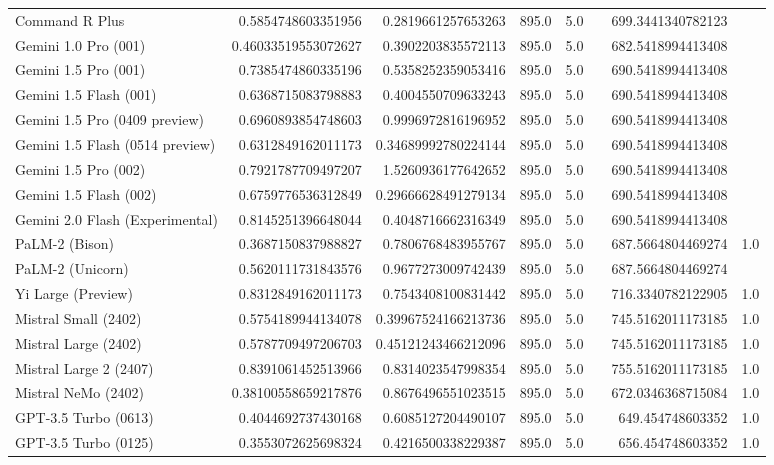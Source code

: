\begin{table}[htp]
{\begin{tabular}{lrrrrrrr}
Command R Plus & 0.5854748603351956 & 0.2819661257653263 & 895.0 & 5.0 &  & 699.3441340782123 &  \\
Gemini 1.0 Pro (001) & 0.46033519553072627 & 0.3902203835572113 & 895.0 & 5.0 &  & 682.5418994413408 &  \\
Gemini 1.5 Pro (001) & 0.7385474860335196 & 0.5358252359053416 & 895.0 & 5.0 &  & 690.5418994413408 &  \\
Gemini 1.5 Flash (001) & 0.6368715083798883 & 0.4004550709633243 & 895.0 & 5.0 &  & 690.5418994413408 &  \\
Gemini 1.5 Pro (0409 preview) & 0.6960893854748603 & 0.9996972816196952 & 895.0 & 5.0 &  & 690.5418994413408 &  \\
Gemini 1.5 Flash (0514 preview) & 0.6312849162011173 & 0.34689992780224144 & 895.0 & 5.0 &  & 690.5418994413408 &  \\
Gemini 1.5 Pro (002) & 0.7921787709497207 & 1.5260936177642652 & 895.0 & 5.0 &  & 690.5418994413408 &  \\
Gemini 1.5 Flash (002) & 0.6759776536312849 & 0.29666628491279134 & 895.0 & 5.0 &  & 690.5418994413408 &  \\
Gemini 2.0 Flash (Experimental) & 0.8145251396648044 & 0.4048716662316349 & 895.0 & 5.0 &  & 690.5418994413408 &  \\
PaLM-2 (Bison) & 0.3687150837988827 & 0.7806768483955767 & 895.0 & 5.0 &  & 687.5664804469274 & 1.0 \\
PaLM-2 (Unicorn) & 0.5620111731843576 & 0.9677273009742439 & 895.0 & 5.0 &  & 687.5664804469274 &  \\
Yi Large (Preview) & 0.8312849162011173 & 0.7543408100831442 & 895.0 & 5.0 &  & 716.3340782122905 & 1.0 \\
Mistral Small (2402) & 0.5754189944134078 & 0.39967524166213736 & 895.0 & 5.0 &  & 745.5162011173185 & 1.0 \\
Mistral Large (2402) & 0.5787709497206703 & 0.45121243466212096 & 895.0 & 5.0 &  & 745.5162011173185 & 1.0 \\
Mistral Large 2 (2407) & 0.8391061452513966 & 0.8314023547998354 & 895.0 & 5.0 &  & 755.5162011173185 & 1.0 \\
Mistral NeMo (2402) & 0.38100558659217876 & 0.8676496551023515 & 895.0 & 5.0 &  & 672.0346368715084 & 1.0 \\
GPT-3.5 Turbo (0613) & 0.4044692737430168 & 0.6085127204490107 & 895.0 & 5.0 &  & 649.454748603352 & 1.0 \\
GPT-3.5 Turbo (0125) & 0.3553072625698324 & 0.4216500338229387 & 895.0 & 5.0 &  & 656.454748603352 & 1.0 \\

\end{tabular}}
\end{table}
